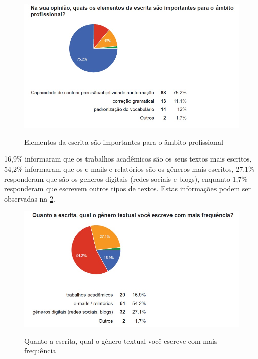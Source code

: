 \documentclass[
	article,			%
	11pt,				%
	oneside,			%
	a4paper,			%
	english,			%
	brazil,				%
	sumario=tradicional
	]{abntex2}
\begin{document}
\begin{figure}[h]  
	\begin{center} 
		\begin{center}
			\changecaptionwidth 
			\captionwidth{13.5cm} %
			\caption{\label{elementos} Elementos da escrita são importantes para o âmbito profissional}
			{\includegraphics[scale=0.8]{imagens/elementosescrita}}
		\end{center}
	\end{center}
\end{figure}
\FloatBarrier


16,9\% informaram que os trabalhos acadêmicos são os seus textos mais escritos, 54,2\% informaram que os e-mails e relatórios são os gêneros mais escritos, 27,1\% responderam que são os generos digitais (redes sociais e blogs), enquanto 1,7\% responderam que escrevem outros tipos de textos. Estas informações podem ser observadas na \figurename{ \ref{genero}}.

\begin{figure}[h]  
	\begin{center} 
		\begin{center}
			\changecaptionwidth 
			\captionwidth{13.5cm} %
			\caption{\label{genero} Quanto a escrita, qual o gênero textual você escreve com mais frequência}
			{\includegraphics[scale=0.8]{imagens/generotextual}}
		\end{center}
	\end{center}
\end{figure}
\FloatBarrier
\end{document}

